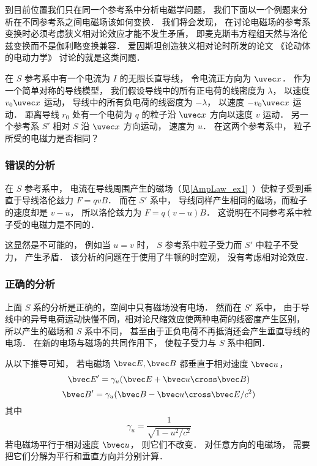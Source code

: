 
\begin{issues}
\issueDraft
\end{issues}


到目前位置我们只在同一个参考系中分析电磁学问题， 我们下面以一个例题来分析在不同参考系之间电磁场该如何变换． 我们将会发现， 在讨论电磁场的参考系变换时必须考虑狭义相对论效应才能不发生矛盾， 即麦克斯韦方程组天然与洛伦兹变换而不是伽利略变换兼容． 爱因斯坦创造狭义相对论时所发的论文 《论动体的电动力学》 讨论的就是这类问题．

在 $S$ 参考系中有一个电流为 $I$ 的无限长直导线， 令电流正方向为 $\uvec x$． 作为一个简单对称的导线模型， 我们假设导线中的所有正电荷的线密度为 $\lambda$， 以速度 $v_0\uvec x$ 运动， 导线中的所有负电荷的线密度为 $-\lambda$，  以速度 $-v_0\uvec x$ 运动． 距离导线 $r_0$ 处有一个电荷为 $q$ 的粒子沿 $\uvec x$ 方向以速度 $v$ 运动． 另一个参考系 $S'$ 相对 $S$ 沿 $\uvec x$ 方向运动， 速度为 $u$． 在这两个参考系中， 粒子所受的电磁力是否相同？

\subsubsection{错误的分析}
在 $S$ 参考系中， 电流在导线周围产生的磁场（见\autoref{AmpLaw_ex1}~）使粒子受到垂直于导线洛伦兹力 $F = qvB$． 而在 $S'$ 系中， 导线同样产生相同的磁场，而粒子的速度却是 $v - u$， 所以洛伦兹力为 $F = q(v-u)B$． 这说明在不同参考系中粒子受的电磁力是不同的．

这显然是不可能的， 例如当 $u = v$ 时， $S$ 参考系中粒子受力而 $S'$ 中粒子不受力， 产生矛盾． 该分析的问题在于使用了牛顿的时空观， 没有考虑相对论效应．

\subsubsection{正确的分析}
上面 $S$ 系的分析是正确的，空间中只有磁场没有电场． 然而在 $S'$ 系中， 由于导线中的异号电荷运动快慢不同，相对论尺缩效应使两种电荷的线密度产生区别， 所以产生的磁场和 $S$ 系中不同， 甚至由于正负电荷不再抵消还会产生垂直导线的电场． 在新的电场与磁场的共同作用下， 使粒子受力与 $S$ 系中相同．

从以下推导可知， 若电磁场 $\bvec E, \bvec B$ 都垂直于相对速度 $\bvec u$，%
\begin{equation}
\bvec E' = \gamma_u (\bvec E + \bvec u \cross \bvec B)
\end{equation}
\begin{equation}
\bvec B' = \gamma_u (\bvec B - \bvec u \cross \bvec E/c^2)
\end{equation}
其中
\begin{equation}
\gamma_u = \frac{1}{\sqrt{1 - u^2/c^2}}
\end{equation}
若电磁场平行于相对速度 $\bvec u$， 则它们不改变． 对任意方向的电磁场， 需要把它们分解为平行和垂直方向并分别计算．

